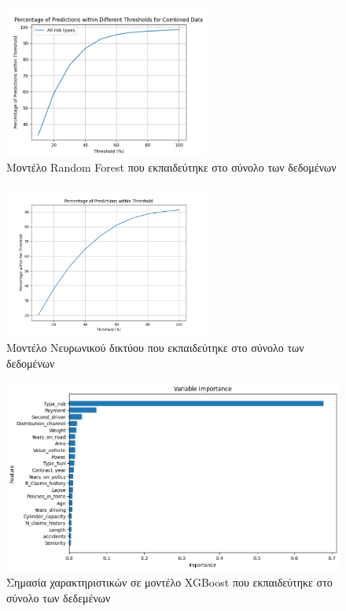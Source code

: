\documentclass{llncs}
\begin{document}
\begin{figure}
    \begin{center}
        \includegraphics[width=0.6\textwidth]{images/combined_trained_all_thresholds_random_forest.png}
    \end{center}
    \caption{Μοντέλο Random Forest που εκπαιδεύτηκε στο σύνολο των δεδομένων}  
    \label{fig:random_forest_result}  
\end{figure}

\begin{figure}
    \begin{center}
        \includegraphics[width=0.6\textwidth]{images/neural_network_all_thresholds.png}
    \end{center}
    \caption{Μοντέλο Νευρωνικού δικτύου που εκπαιδεύτηκε στο σύνολο των δεδομένων}  
    \label{fig:neural_result}  
\end{figure}

\begin{figure}
    \begin{center}
        \includegraphics[width=1\textwidth]{images/feature_importance_combined_xgb.png}
    \end{center}
    \caption{Σημασία χαρακτηριστικών σε μοντέλο XGBoost που εκπαιδεύτηκε στο σύνολο των δεδεμένων}  
    \label{fig:XGBoost_all_feature_importance}  
\end{figure}
\end{document}
